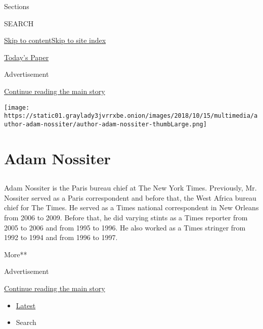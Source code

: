 Sections

SEARCH

\protect\hyperlink{site-content}{Skip to
content}\protect\hyperlink{site-index}{Skip to site index}

\href{https://myaccount.nytimes3xbfgragh.onion/auth/login?response_type=cookie\&client_id=vi}{}

\href{https://www.nytimes3xbfgragh.onion/section/todayspaper}{Today's
Paper}

Advertisement

\protect\hyperlink{after-top}{Continue reading the main story}

\texttt{[image: https://static01.graylady3jvrrxbe.onion/images/2018/10/15/multimedia/author-adam-nossiter/author-adam-nossiter-thumbLarge.png]}

\hypertarget{adam-nossiter}{%
\section{Adam Nossiter}\label{adam-nossiter}}

\subsection{}

Adam Nossiter is the Paris bureau chief at The New York Times.
Previously, Mr. Nossiter served as a Paris correspondent and before
that, the West Africa bureau chief for The Times. He served as a Times
national correspondent in New Orleans from 2006 to 2009. Before that, he
did varying stints as a Times reporter from 2005 to 2006 and from 1995
to 1996. He also worked as a Times stringer from 1992 to 1994 and from
1996 to 1997.

More**

Advertisement

\protect\hyperlink{after-mid1}{Continue reading the main story}

\begin{itemize}
\tightlist
\item
  \protect\hyperlink{stream-panel}{Latest}
\item
  Search
\end{itemize}

